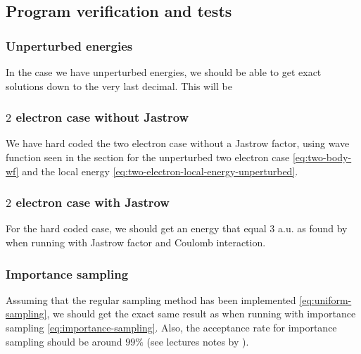 \documentclass[11pt]{article}
\begin{document}

\subsection{Program verification and tests}
\subsubsection{Unperturbed energies}
In the case we have unperturbed energies, we should be able to get exact solutions down to the very last decimal. This will be 

\subsubsection{\texorpdfstring{$2$}{a} electron case without Jastrow}
We have hard coded the two electron case without a Jastrow factor, using wave function seen in the section for the unperturbed two electron case \eqref{eq:two-body-wf} and the local energy \eqref{eq:two-electron-local-energy-unperturbed}.

\subsubsection{\texorpdfstring{$2$}{a} electron case with Jastrow}
For the hard coded case, we should get an energy that equal 3 a.u. as found by \citet{PhysRevA.48.3561} when running with Jastrow factor and Coulomb interaction.

\subsubsection{Importance sampling}
Assuming that the regular sampling method has been implemented \eqref{eq:uniform-sampling}, we should get the exact same result as when running with importance sampling \eqref{eq:importance-sampling}. Also, the acceptance rate for importance sampling should be around $99\%$ (see lectures notes by \citet{komp2015}).
\end{document}
